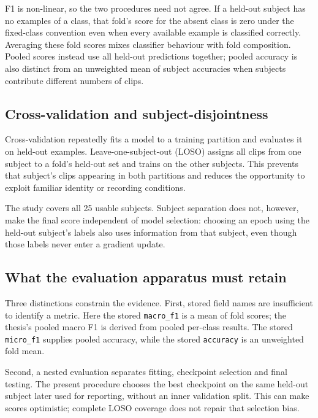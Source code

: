 F1 is non-linear, so the two procedures need not agree. If a held-out subject has no examples of a class, that fold's score for the absent class is zero under the fixed-class convention even when every available example is classified correctly. Averaging these fold scores mixes classifier behaviour with fold composition. Pooled scores instead use all held-out predictions together; pooled accuracy is also distinct from an unweighted mean of subject accuracies when subjects contribute different numbers of clips.

\subsection{Cross-validation and subject-disjointness}
\label{sec:cross-validation}

Cross-validation repeatedly fits a model to a training partition and evaluates it on held-out examples. Leave-one-subject-out (LOSO) assigns all clips from one subject to a fold's held-out set and trains on the other subjects. This prevents that subject's clips appearing in both partitions and reduces the opportunity to exploit familiar identity or recording conditions.

The study covers all 25 usable subjects. Subject separation does not, however, make the final score independent of model selection: choosing an epoch using the held-out subject's labels also uses information from that subject, even though those labels never enter a gradient update.

\subsection{What the evaluation apparatus must retain}
\label{sec:apparatus-gaps}

Three distinctions constrain the evidence. First, stored field names are insufficient to identify a metric. Here the stored \texttt{macro\_f1} is a mean of fold scores; the thesis's pooled macro F1 is derived from pooled per-class results. The stored \texttt{micro\_f1} supplies pooled accuracy, while the stored \texttt{accuracy} is an unweighted fold mean.

Second, a nested evaluation separates fitting, checkpoint selection and final testing. The present procedure chooses the best checkpoint on the same held-out subject later used for reporting, without an inner validation split. This can make scores optimistic; complete LOSO coverage does not repair that selection bias.

